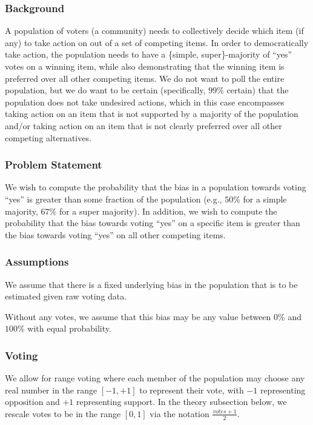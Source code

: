 \documentclass{sigchi}
\begin{document}
\subsubsection{Background}
A population of voters (a community) needs to collectively decide which item (if any) to take action on out of a set of competing items.
In order to democratically take action, the population needs to have a \{simple, super\}-majority of ``yes'' votes on a
winning item, while also demonstrating that the winning item is preferred over all other competing items.
We do not want to poll the entire population, but we do want to be certain (specifically, $99\%$ certain) that
the population does not take undesired actions, which in this case encompasses taking action on an item that is not
supported by a majority of the population and/or taking action on an item that is not clearly preferred over all
other competing alternatives.

\subsubsection{Problem Statement}
We wish to compute the probability that the bias in a population towards voting ``yes'' is greater than some
fraction of the population (e.g., $50\%$ for a simple majority, $67\%$ for a super majority).
In addition, we wish to compute the probability that the bias towards voting ``yes'' on a specific item is greater
than the bias towards voting ``yes'' on all other competing items.

\subsubsection{Assumptions}
We assume that there is a fixed underlying bias in the population that is to be estimated given raw voting data.

Without any votes, we assume that this bias may be any value between $0\%$ and $100\%$ with equal probability.

\subsubsection{Voting}
We allow for range voting where each member of the population may choose any real number in the range $[-1,+1]$ to
represent their vote, with $-1$ representing opposition and $+1$ representing support.
In the theory subsection below, we rescale votes to be in the range $[0,1]$ via the notation $\frac{votes + 1}{2}$.
\end{document}
